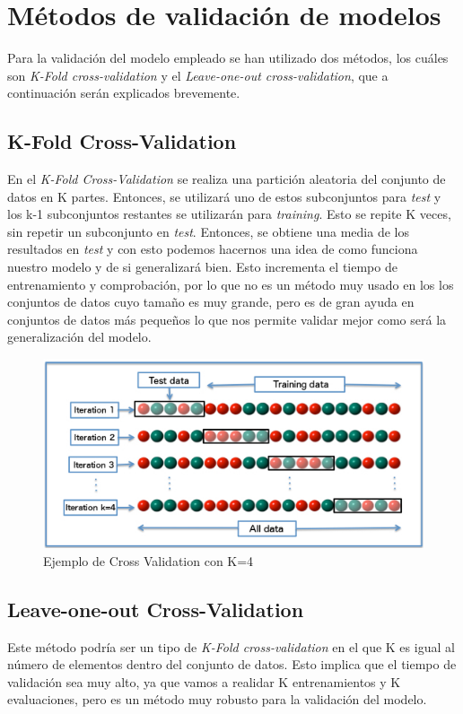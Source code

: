\section{Métodos de validación de modelos}

Para la validación del modelo empleado se han utilizado dos métodos, los cuáles son \textit{K-Fold cross-validation} y el \textit{Leave-one-out cross-validation}, que a continuación serán explicados brevemente.\\

\subsection{K-Fold Cross-Validation}

En el \textit{K-Fold Cross-Validation} se realiza una partición aleatoria del conjunto de datos en K partes. Entonces, se utilizará uno de estos subconjuntos para \textit{test} y los k-1 subconjuntos restantes se utilizarán para \textit{training}. Esto se repite K veces, sin repetir un subconjunto en \textit{test}. Entonces, se obtiene una media de los resultados en \textit{test} y con esto podemos hacernos una idea de como funciona nuestro modelo y de si generalizará bien. Esto incrementa el tiempo de entrenamiento y comprobación, por lo que no es un método muy usado en los los conjuntos de datos cuyo tamaño es muy grande, pero es de gran ayuda en conjuntos de datos más pequeños lo que nos permite validar mejor como será la generalización del modelo.\\

\begin{figure}[H]
	\centering
	\caption{Ejemplo de Cross Validation con K=4 \cite{k-fold}}
	\includegraphics[width=\textwidth]{./imagenes/K-fold.jpg}
\end{figure}

\subsection{Leave-one-out Cross-Validation}
Este método podría ser un tipo de \textit{K-Fold cross-validation} en el que K es igual al número de elementos dentro del conjunto de datos. Esto implica que el tiempo de validación sea muy alto, ya que vamos a realidar K entrenamientos y K evaluaciones, pero es un método muy robusto para la validación del modelo.

